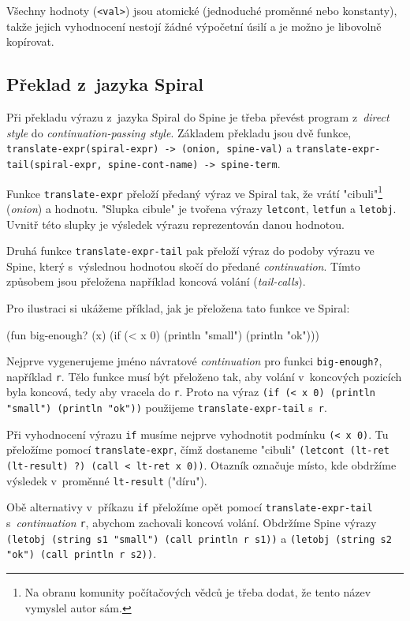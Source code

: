 Všechny hodnoty (\texttt{<val>}) jsou atomické (jednoduché proměnné nebo
konstanty), takže jejich vyhodnocení nestojí žádné výpočetní úsilí a je možno je
libovolně kopírovat.

\subsection{Překlad z~jazyka Spiral}

Při překladu výrazu z~jazyka Spiral do Spine je třeba převést program
z~\emph{direct style} do \emph{continuation-passing style}. Základem překladu
jsou dvě funkce, \texttt{translate-expr(spiral-expr) -> (onion, spine-val)} a
\texttt{translate-expr-tail(spiral-expr, spine-cont-name) -> spine-term}.

Funkce \texttt{translate-expr} přeloží předaný výraz ve Spiral tak, že vrátí
"cibuli"\footnote{Na obranu komunity počítačových vědců je třeba dodat, že
tento název vymyslel autor sám.} (\emph{onion}) a hodnotu. "Slupka cibule" je
tvořena výrazy \texttt{letcont}, \texttt{letfun} a \texttt{letobj}. Uvnitř této
slupky je výsledek výrazu reprezentován danou hodnotou.

Druhá funkce \texttt{translate-expr-tail} pak přeloží výraz do podoby výrazu ve
Spine, který s~výslednou hodnotou skočí do předané \emph{continuation}. Tímto
způsobem jsou přeložena například koncová volání (\emph{tail-calls}).

Pro ilustraci si ukážeme příklad, jak je přeložena tato funkce ve Spiral:

\begin{spiral}
(fun big-enough? (x)
  (if (< x 0)
    (println "small")
    (println "ok")))
\end{spiral}

Nejprve vygenerujeme jméno návratové \emph{continuation} pro funkci
\texttt{big-enough?}, například \texttt{r}. Tělo funkce musí být přeloženo tak,
aby volání v~koncových pozicích byla koncová, tedy aby vracela do \texttt{r}.
Proto na výraz \texttt{(if (< x 0) (println "small") (println "ok"))} použijeme
\texttt{translate-expr-tail} s~\texttt{r}.

Při vyhodnocení výrazu \texttt{if} musíme nejprve vyhodnotit podmínku \texttt{(<
x 0)}. Tu přeložíme pomocí \texttt{translate-expr}, čímž dostaneme "cibuli"
\texttt{(letcont (lt-ret (lt-result) ?) (call < lt-ret x 0))}. Otazník označuje
místo, kde obdržíme výsledek v~proměnné \texttt{lt-result} ("díru").

Obě alternativy v~příkazu \texttt{if} přeložíme opět pomocí
\texttt{translate-expr-tail} s~\emph{continuation} \texttt{r}, abychom zachovali
koncová volání. Obdržíme Spine výrazy \texttt{(letobj (string s1 "small") (call
println r s1))} a \texttt{(letobj (string s2 "ok") (call println r s2))}.

